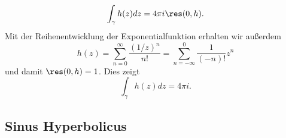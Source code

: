 \documentclass[a4paper]{article}
\begin{document}
\begin{enumerate}
	\begin{equation*}
		\int_\gamma h(z) dz = 4 \pi i \res(0, h)\text{.}
	\end{equation*}
	Mit der Reihenentwicklung der Exponentialfunktion erhalten wir außerdem
	\begin{equation*}
		h(z) = \sum_{n = 0}^{\infty} \frac{(1/z)^n}{n!} = \sum_{n = -\infty}^{0} \frac{1}{(-n)!} z^n
	\end{equation*}
	und damit $\res(0, h) = 1$. Dies zeigt
	\begin{equation*}
		\int_\gamma h(z) dz = 4 \pi i\text{.}
	\end{equation*}
\end{enumerate}

\subsection{Sinus Hyperbolicus}
\end{document}
